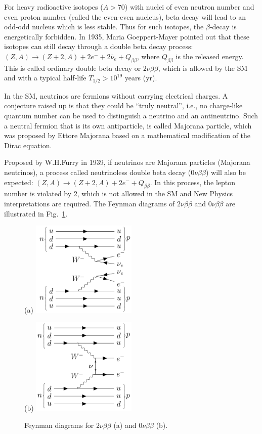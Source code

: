 For heavy radioactive isotopes ($A>70$) with nuclei of even neutron number and even proton number (called the even-even nucleus), beta decay will lead to an odd-odd nucleus which is less stable. Thus for such isotopes, the $\beta$-decay is energetically forbidden. In 1935, Maria Goeppert-Mayer pointed out that these isotopes can still decay through a double beta decay process: $(Z,A) \to (Z+2,A)+2e^{-}+2\bar{\nu}_e+Q_{\beta\beta}$, where $Q_{\beta\beta}$ is the released energy. This is called ordinary double beta decay or $2\nu\beta\beta$, which is allowed by the SM and with a typical half-life $T_{1/2}>10^{19}$ years (yr)\cite{povh2008particles,martin2019nuclear}.

In the SM, neutrinos are fermions without carrying electrical charges. A conjecture raised up is that they could be ``truly neutral'', i.e., no charge-like quantum number can be used to distinguish a neutrino and an antineutrino\cite{akhmedov2014majorana}. Such a neutral fermion 
that is its own antiparticle, is called Majorana particle, which was proposed by Ettore Majorana based on a mathematical modification of the Dirac equation\cite{majorana2006symmetric}.

Proposed by W.H.Furry in 1939\cite{furry1939transition}, if neutrinos are Majorana particles (Majorana neutrinos), a process called neutrinoless double beta decay ($0\nu\beta\beta$) will also be expected: $(Z,A) \to (Z+2,A)+2e^{-}+Q_{\beta\beta}$. In this process, the lepton number is violated by 2, which is not allowed in the SM and New Physics interpretations are required. The Feynman diagrams of $2\nu\beta\beta$ and $0\nu\beta\beta$ are illustrated in Fig.~\ref{feynman1}.
\begin{figure}[htbp]
	\centering
	{	
		\begin{minipage}[t]{0.45\textwidth}{(a)}
			\includegraphics[width=5cm]{doubleBeta2nu_feynman.png}
		\end{minipage}
		\begin{minipage}[t]{0.45\textwidth}{(b)}
			\includegraphics[width=5cm]{doubleBeta_feynman.png}
		\end{minipage}
		\caption[Feynman diagrams for $2\nu\beta\beta$ and $0\nu\beta\beta$.]{Feynman diagrams for $2\nu\beta\beta$ (a) and $0\nu\beta\beta$ (b).}
		\label{feynman1}
	}
\end{figure}

